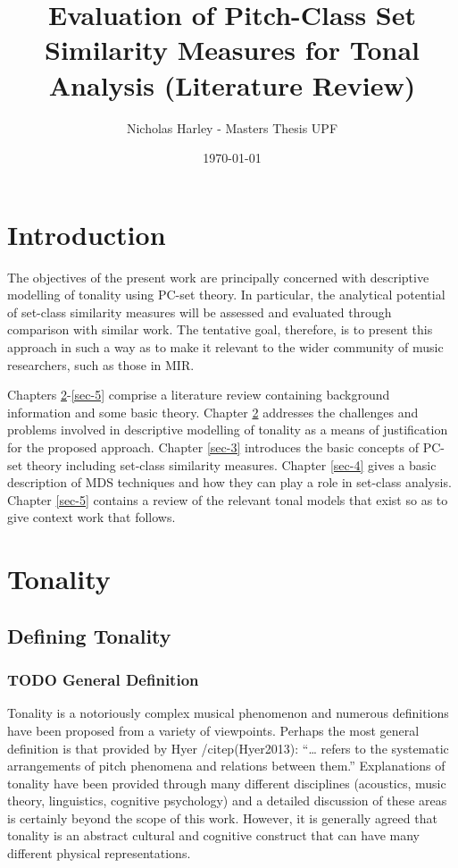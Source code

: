 \documentclass{article}
\title{Evaluation of Pitch-Class Set Similarity Measures for Tonal Analysis (Literature Review)}
\author{Nicholas Harley - Masters Thesis UPF}
\date{\today}
\begin{document}
\maketitle

\setcounter{tocdepth}{3}
\tableofcontents
\vspace*{1cm}

\clearpage
\glsaddall
\printglossary
\clearpage
\section{Introduction}
\label{sec-1}

The objectives of the present work are principally concerned with
descriptive modelling of tonality using PC-set theory. In particular,
the analytical potential of set-class similarity measures will be
assessed and evaluated through comparison with similar work. The
tentative goal, therefore, is to present this approach in such a way
as to make it relevant to the wider community of music researchers,
such as those in MIR.

Chapters \ref{sec-2}-\ref{sec-5} comprise a literature
review containing background information and some basic
theory. Chapter \ref{sec-2} addresses the challenges and problems
involved in descriptive modelling of tonality as a means of
justification for the proposed approach. Chapter \ref{sec-3} introduces the basic concepts of PC-set theory including
set-class similarity measures. Chapter \ref{sec-4}
gives a basic description of MDS techniques and how they can play a
role in set-class analysis. Chapter \ref{sec-5}
contains a review of the relevant tonal models that exist so as to
give context work that follows.
\section{Tonality}
\label{sec-2}
\subsection{Defining Tonality}
\label{sec-2-1}
\subsubsection{\textbf{TODO} General Definition}
\label{sec-2-1-1}

Tonality is a notoriously complex musical phenomenon and numerous
definitions have been proposed from a variety of viewpoints. Perhaps
the most general definition is that provided by Hyer /citep(Hyer2013):
``\ldots{} refers to the systematic arrangements of pitch phenomena and
relations between them.'' Explanations of tonality have been provided
through many different disciplines (acoustics, music theory,
linguistics, cognitive psychology) and a detailed discussion of these
areas is certainly beyond the scope of this work. However, it is
generally agreed that tonality is an abstract cultural and cognitive
construct that can have many different physical representations.
\end{document}
